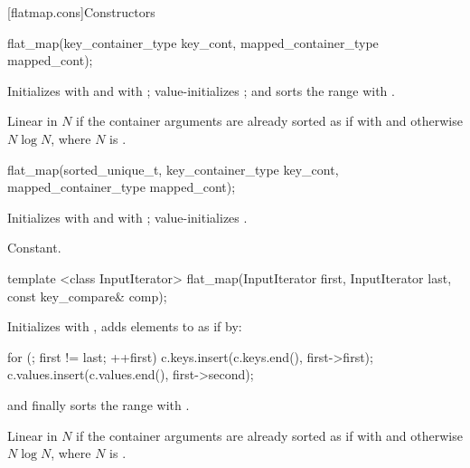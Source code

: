 \begin{codeblock}
\begin{codeblock}
\begin{codeblock}
\begin{addedblock}
[flatmap.cons]{Constructors}

%
\begin{itemdecl}
flat_map(key_container_type key_cont, mapped_container_type mapped_cont);
\end{itemdecl}

\begin{itemdescr}
\pnum
\effects Initializes  with  and
 with ; value-initializes
; and sorts the range  with
.

\pnum
\complexity
Linear in $N$ if the container arguments are already sorted as if
with  and otherwise $N \log N$, where $N$
is .
\end{itemdescr}

%
\begin{itemdecl}
flat_map(sorted_unique_t, key_container_type key_cont, mapped_container_type mapped_cont);
\end{itemdecl}

\begin{itemdescr}
\pnum
\effects Initializes  with
 and  with
; value-initializes .

\pnum
\complexity
Constant.
\end{itemdescr}

%
\begin{itemdecl}
template <class InputIterator>
  flat_map(InputIterator first, InputIterator last, const key_compare& comp);
\end{itemdecl}

\begin{itemdescr}
\pnum
\effects Initializes  with , adds elements to
 as if by:
\begin{codeblock}
for (; first != last; ++first) {
  c.keys.insert(c.keys.end(), first->first); 
  c.values.insert(c.values.end(), first->second); 
}
\end{codeblock}
and finally sorts the range  with .

\pnum
\complexity
Linear in $N$ if the container arguments are already sorted as if with
 and otherwise $N \log N$, where $N$ is
.
\end{itemdescr}


\end{addedblock}
\end{codeblock}
\end{codeblock}
\end{codeblock}

